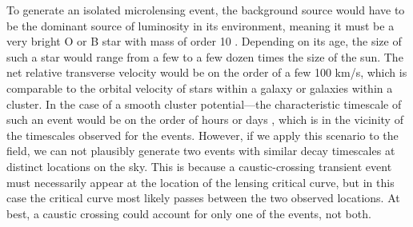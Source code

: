 To generate an isolated microlensing event, the background source
would have to be the dominant source of luminosity in its environment,
meaning it must be a very bright O or B star with mass of order 10
\Msun.  Depending on its age, the size of such a star would range from
a few to a few dozen times the size of the sun.  The net relative
transverse velocity would be on the order of a few 100 km/s, which is
comparable to the orbital velocity of stars within a galaxy or
galaxies within a cluster.  In the case of a smooth cluster potential---the
%
%
%
characteristic timescale of such an event would be on the order of
hours or days \citet{Chang:1979,Chang:1984,MiraldaEscude:1991}, which
is in the vicinity of the timescales observed for the \spock events.
However, if we apply this scenario to the  field, we can not
plausibly generate two events with similar decay timescales at
distinct locations on the sky.  This is because a caustic-crossing
transient event must necessarily appear at the location of the lensing
critical curve, but in this case the critical curve most likely passes
between the two observed \spock locations. At best, a caustic crossing
could account for only one of the \spock events, not both.
